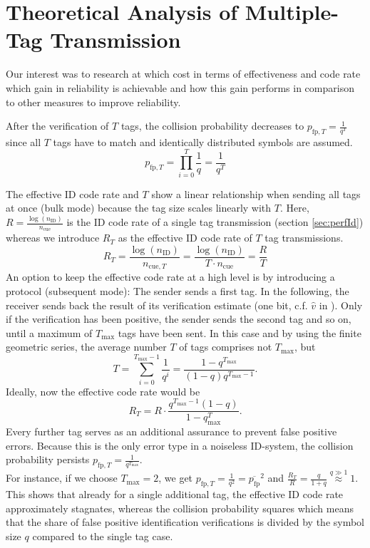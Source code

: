 \documentclass[english,BCOR=4mm,cdfont=false]{tudscrreprt} %
\begin{document}
\section{Theoretical Analysis of Multiple-Tag Transmission}
\label{sec:multTag}
Our interest was to research at which cost in terms of effectiveness and code rate which gain in reliability is achievable and how this gain performs in comparison to other measures to improve reliability.

After the verification of $T$ tags, the collision probability decreases to $p_{\text{fp},T} = \frac{1}{q^T}$ since all $T$ tags have to match and identically distributed symbols are assumed.
\begin{equation}
    p_{\text{fp},T} = \prod_{i=0}^T \frac{1}{q} = \frac{1}{q^T} \label{eq: false positive probability T tags}
\end{equation}

The effective ID code rate and $T$ show a linear relationship when sending all tags at once (bulk mode) because the tag size scales linearly with $T$. Here, $R = \frac{\log(n_\text{ID})}{n_\text{cue}}$ is the ID code rate of a single tag transmission (section \ref{sec:perfId}) whereas we introduce $R_T$ as the effective ID code rate of $T$ tag transmissions. 
\begin{equation}
    R_T = \frac{\log(n_\text{ID})}{n_{\text{cue},T}} = \frac{\log(n_\text{ID})}{T \cdot n_{\text{cue}}} = \frac{R}{T}
\end{equation}
An option to keep the effective code rate at a high level is by introducing a protocol (subsequent mode): The sender sends a first tag. In the following, the receiver sends back the result of its verification estimate (one bit, c.f. $\hat{v}$ in \cite{Codes_for_ID_Tutorial}). Only if the verification has been positive, the sender sends the second tag and so on, until a maximum of $T_\text{max}$ tags have been sent. 
In this case and by using the finite geometric series, the average number $T$ of tags comprises not $T_\text{max}$, but
\begin{equation}
    T = \displaystyle \sum_{i=0}^{T_\text{max} - 1} \frac{1}{q^i} = \frac{1-q^{T_\text{max}}}{(1-q)q^{T_\text{max} - 1}}.
\end{equation}
Ideally, now the effective code rate would be
\begin{equation}
    R_T = R \cdot \frac{q^{T_\text{max} - 1}(1-q)}{1-q^T_\text{max}}.
\end{equation}
Every further tag serves as an additional assurance to prevent false positive errors. Because this is the only error type in a noiseless ID-system, the collision probability persists $p_{\text{fp},T} = \frac{1}{q^{T_\text{max}}}$.\\
For instance, if we choose $T_\text{max} = 2$, we get $p_{\text{fp},T} = \frac{1}{q^2} = \overline{p_{\text{fp}}}^2$ and $\frac{R_T}{R} =\frac{q}{1+q} \overset{q\gg1}{\approx} 1$. This shows that already for a single additional tag, the effective ID code rate approximately stagnates, whereas the collision probability squares which means that the share of false positive identification verifications is divided by the symbol size $q$ compared to the single tag case.
\end{document}
